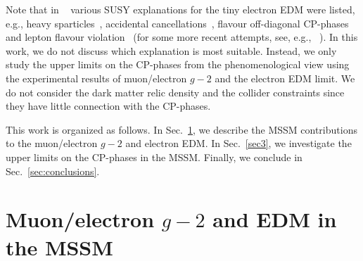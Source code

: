 \documentclass[a4paper,11pt]{article}
\begin{document}
   Note that in  ~\cite{Kraml:2007pr} various SUSY explanations for the tiny electron EDM were listed, e.g., 
   heavy sparticles~\cite{Nath:1991dn,Kizukuri:1991mb,Kizukuri:1992nj,Cohen:1996vb,Falk:1995fk}, 
   accidental cancellations~\cite{Falk:1996ni,Falk:1998pu,Ibrahim:1997gj,Ibrahim:1997nc,Ibrahim:1998je,Brhlik:1998zn,Brhlik:1999ub,Bartl:1999bc,Pokorski:1999hz,Arnowitt:2001pm,Dhuria:2013syh}, 
   flavour off-diagonal CP-phases~\cite{Abel:2001vy} and  
   lepton flavour violation~\cite{Bartl:2003ju} (for some more recent attempts, see, e.g.,  ~\cite{Diaz-Cruz:2005uyk,Paradisi:2009ey,Moroi:2011fi,Ibe:2021cvf}).
  In this work, we do not discuss which explanation is most suitable. Instead, we only study the upper limits on the  CP-phases from the phenomenological view using the experimental results of muon/electron $g-2$ and the electron EDM limit. We do not consider the dark matter relic density and the collider constraints since they have little connection with the CP-phases.
   
   This work is organized as follows. In Sec.~\ref{sec2}, we describe the MSSM contributions to the muon/electron $g-2$ and electron EDM.  In Sec.~\ref{sec3}, we investigate the upper limits on the CP-phases in the MSSM. Finally, we conclude in Sec.~\ref{sec:conclusions}.

   \section{Muon/electron \texorpdfstring{$g-2$}{g-2} and EDM in the MSSM}\label{sec2}
\end{document}
